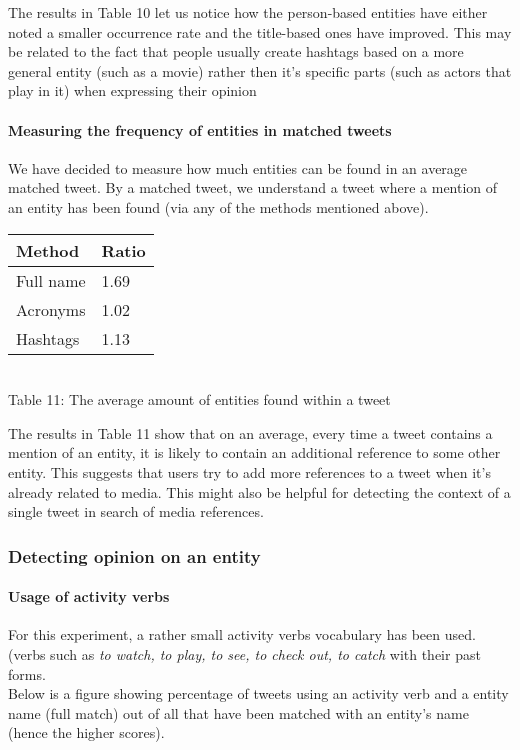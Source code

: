 The results in Table 10 let us notice how the person-based entities have either noted a smaller
occurrence rate and the title-based ones have improved. This may be related to the
fact that people usually create hashtags based on a more general entity (such as
a movie) rather then it's specific parts (such as actors that play in it)
when expressing their opinion \cite{edinburg-corpus}

\paragraph{Measuring the frequency of entities in matched tweets}
We have decided to measure how much entities can be found in an average matched tweet. By a matched tweet,
we understand a tweet where a mention of an entity has been found (via any of the methods mentioned above).

\begin{center}
  \begin{tabular}{ | p{4cm} | p{2cm} | } \hline
    Method & Ratio \\ \hline
    Full name & 1.69 \\ \hline
    Acronyms & 1.02 \\ \hline
    Hashtags & 1.13 \\ \hline
  \end{tabular} \\
  Table 11: The average amount of entities found within a tweet \\
\end{center}

The results in Table 11 show that on an average, every time a tweet contains a mention of an entity,
it is likely to contain an additional reference to some other entity. This suggests that users try to add
more references to a tweet when it's already related to media. This might also be helpful for detecting the
context of a single tweet in search of media references.


\subsubsection{Detecting opinion on an entity}
\paragraph{Usage of activity verbs}
For this experiment, a rather small activity verbs vocabulary has been used. (verbs such
as \textit{to watch, to play, to see, to check out, to catch} with their past forms.
\\ Below is a figure showing percentage of tweets using an activity verb
and a entity name (full match) out of all that have been matched with an
entity's name (hence the higher scores).


